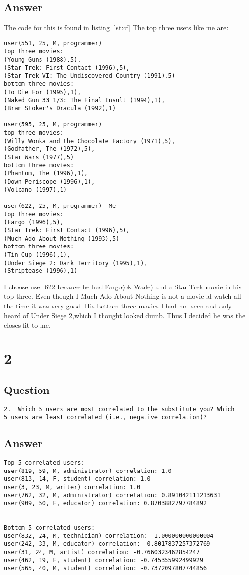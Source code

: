 \documentclass[letterpaper,10pt]{article}
\begin{document}
\subsection*{Answer}
The code for this is found in listing \ref{lst:cf}
The top three users like me are:
\begin{verbatim}
user(551, 25, M, programmer)
top three movies: 
(Young Guns (1988),5),
(Star Trek: First Contact (1996),5),
(Star Trek VI: The Undiscovered Country (1991),5)
bottom three movies: 
(To Die For (1995),1),
(Naked Gun 33 1/3: The Final Insult (1994),1),
(Bram Stoker's Dracula (1992),1)

user(595, 25, M, programmer)
top three movies: 
(Willy Wonka and the Chocolate Factory (1971),5),
(Godfather, The (1972),5),
(Star Wars (1977),5)
bottom three movies: 
(Phantom, The (1996),1),
(Down Periscope (1996),1),
(Volcano (1997),1)

user(622, 25, M, programmer) -Me
top three movies: 
(Fargo (1996),5),
(Star Trek: First Contact (1996),5),
(Much Ado About Nothing (1993),5)
bottom three movies: 
(Tin Cup (1996),1),
(Under Siege 2: Dark Territory (1995),1),
(Striptease (1996),1)
\end{verbatim}
I choose user 622 because he had Fargo(ok Wade) and a Star Trek movie in his top three.
Even though I Much Ado About Nothing is not a movie id watch all the time it was very good. 
His bottom three movies I had not seen and only heard of Under Siege 2,which I thought looked dumb.
Thus I decided he was the closes fit to me.

\section*{2}
\subsection*{Question}
\begin{verbatim}
2.  Which 5 users are most correlated to the substitute you? Which
5 users are least correlated (i.e., negative correlation)?
\end{verbatim}
\subsection*{Answer}
\begin{verbatim}
Top 5 correlated users:
user(819, 59, M, administrator) correlation: 1.0
user(813, 14, F, student) correlation: 1.0
user(3, 23, M, writer) correlation: 1.0
user(762, 32, M, administrator) correlation: 0.891042111213631
user(909, 50, F, educator) correlation: 0.8703882797784892


Bottom 5 correlated users:
user(832, 24, M, technician) correlation: -1.000000000000004
user(242, 33, M, educator) correlation: -0.8017837257372769
user(31, 24, M, artist) correlation: -0.7660323462854247
user(462, 19, F, student) correlation: -0.745355992499929
user(565, 40, M, student) correlation: -0.7372097807744856
\end{verbatim}
\end{document}
